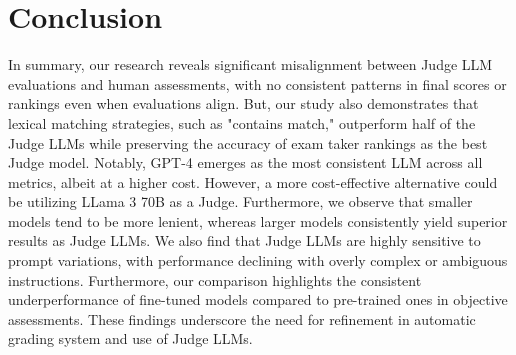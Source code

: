 \section {Conclusion}

In summary, our research reveals significant misalignment between Judge LLM evaluations and human assessments, with no consistent patterns in final scores or rankings even when evaluations align. But, our study also demonstrates that lexical matching strategies, such as "contains match," outperform half of the Judge LLMs while preserving the accuracy of exam taker rankings as the best Judge model. Notably, GPT-4 emerges as the most consistent LLM across all metrics, albeit at a higher cost. However, a more cost-effective alternative could be utilizing LLama 3 70B as a Judge. Furthermore, we observe that smaller models tend to be more lenient, whereas larger models consistently yield superior results as Judge LLMs. 
We also find that Judge LLMs are highly sensitive to prompt variations, with performance declining with overly complex or ambiguous instructions. Furthermore, our comparison highlights the consistent underperformance of fine-tuned models compared to pre-trained ones in objective assessments. These findings underscore the need for refinement in automatic grading system and use of Judge LLMs.








